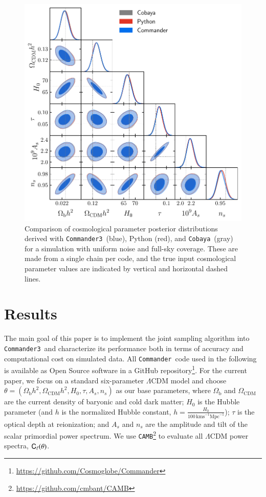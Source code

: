 \documentclass[twocolumn]{aa}
\def\commander{\texttt{Commander}}
\def\commanderthree{\texttt{Commander3}}
\def\cobaya{\texttt{Cobaya}}
\def\camb{\texttt{CAMB}}
\begin{document}
\begin{figure}
	\centering
	\includegraphics[width=\linewidth]{figures/dist_posterior_no_mask.pdf}
	\caption{\label{fig:nomask}Comparison of cosmological parameter posterior distributions derived with \commanderthree\ (blue), Python (red), and \cobaya\ (gray) for a simulation with uniform noise and full-sky coverage. These are made from a single chain per code, and the true input cosmological parameter values are indicated by vertical and horizontal dashed lines.}
\end{figure}


\section{Results}
\label{sec:results}

The main goal of this paper is to implement the joint sampling algorithm into \commanderthree\ and characterize its performance both in terms of accuracy and computational cost on simulated data. All \commander\ code used in the following is available as Open Source software in a GitHub repository\footnote{\url{https://github.com/Cosmoglobe/Commander}}. For the current paper, we focus on a standard six-parameter $\Lambda$CDM model and choose $\theta=(\Omega_{\textrm{b}}h^2, \Omega_{\textrm{CDM}}h^2, H_0, \tau, A_s, n_s)$ as our base parameters, where $\Omega_\mathrm{b}$ and $\Omega_\mathrm{CDM}$ are the current density of baryonic and cold dark matter; $H_0$ is the Hubble parameter (and $h$ is the normalized Hubble constant, $h=\frac{H_0}{100\,\mathrm{km s}^{-1} \mathrm{Mpc}^{-1}}$); $\tau$ is the optical depth at reionization; and $A_s$ and $n_s$ are the amplitude and tilt of the scalar primordial power spectrum. We use \camb\footnote{\url{https://github.com/cmbant/CAMB}} \citep{Lewis:1999bs} to evaluate all $\Lambda$CDM power spectra, $\mathsf{C}_{\ell}(\theta)$.
\end{document}
